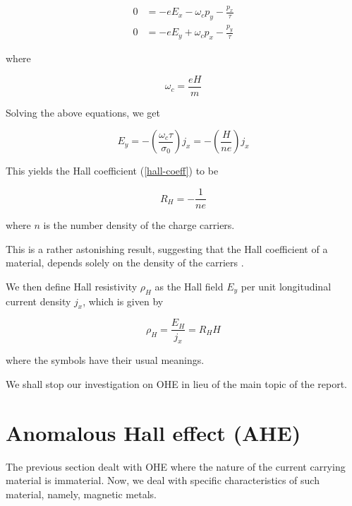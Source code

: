 \begin{equation}
    \begin{split}
        0 &= -e E_x - \omega_c p_y - \frac{p_x}{\tau}\\
        0 &= -e E_y + \omega_c p_x - \frac{p_y}{\tau}
    \end{split}
\end{equation}

where

\begin{equation}
    \omega_c = \frac{e H}{m}
\end{equation}

Solving the above equations, we get

\begin{equation}
    E_y = - \left( \frac{\omega_c \tau}{\sigma_0}  \right) j_x = - \left( \frac{H}{ne} \right) j_x
\end{equation}

This yields the Hall coefficient (\cref{hall-coeff}) to be

\begin{equation}
    \boxed{R_H = - \frac{1}{ne}}
\end{equation}

where $ n $ is the number density of the charge carriers.

This is a rather astonishing result, suggesting that the Hall coefficient of a material, depends solely on the density of the carriers \cite{ashcroft1976solid}.

We then define Hall resistivity $ \rho_H $ as the Hall field $ E_y $ per unit longitudinal current density $ j_x $, which is given by

\begin{equation} \label{hall-resistivity}
    \boxed{\rho_H = \frac{E_H}{j_x} = R_H H}
\end{equation}

where the symbols have their usual meanings.

We shall stop our investigation on OHE in lieu of the main topic of the report.

\section{Anomalous Hall effect (AHE)}

The previous section dealt with OHE where the nature of the current carrying material is immaterial.
Now, we deal with specific characteristics of such material, namely, magnetic metals.

